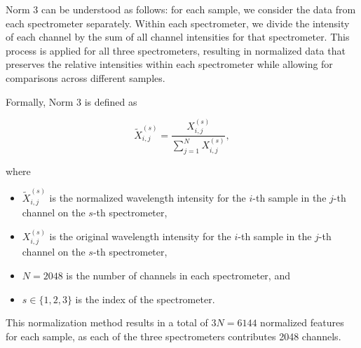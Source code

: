 Norm 3 can be understood as follows: for each sample, we consider the data from each spectrometer separately. Within each spectrometer, we divide the intensity of each channel by the sum of all channel intensities for that spectrometer. This process is applied for all three spectrometers, resulting in normalized data that preserves the relative intensities within each spectrometer while allowing for comparisons across different samples.

Formally, Norm 3 is defined as

\begin{equation}
	\tilde{X}_{i,j}^{(s)} = \frac{X_{i,j}^{(s)}}{\sum_{j=1}^{N} X_{i,j}^{(s)}},
\end{equation}

where

\begin{itemize}
	\item $\tilde{X}_{i,j}^{(s)}$ is the normalized wavelength intensity for the $i$-th sample in the $j$-th channel on the $s$-th spectrometer,
	\item $X_{i,j}^{(s)}$ is the original wavelength intensity for the $i$-th sample in the $j$-th channel on the $s$-th spectrometer,
	\item $N = 2048$ is the number of channels in each spectrometer, and
	\item $s \in \{1, 2, 3\}$ is the index of the spectrometer.
\end{itemize}

This normalization method results in a total of $3N = 6144$ normalized features for each sample, as each of the three spectrometers contributes 2048 channels.
